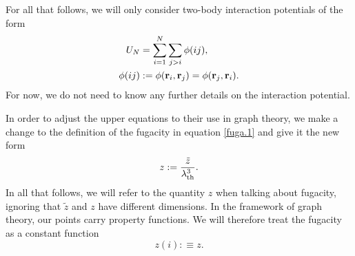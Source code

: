 \documentclass[8.5pt,twoside,twocolumn]{article}
\newcommand\di{\te{d}}
\newcommand\dr{\di\r}
\newcommand\lath{\enmat{\la_\te{th}}}
\renewcommand\r{\bo r}
\theoremstyle{standard}
\begin{document}

For all that follows, we will only consider two-body interaction potentials of the form
\begin{equation}
\begin{aligned}
U_N &= \sum_{i=1}^N \sum_{j>i} \phi(ij), \\
\phi(ij)&:=\phi(\r_i,\r_j) = \phi(\r_j,\r_i).
\label{potential}
\end{aligned}
\end{equation}
For now, we do not need to know any further details on the interaction potential.

In order to adjust the upper equations to their use in graph theory, we make a change to the definition
of the fugacity in equation \eqref{fuga.1} and give it the new form
\begin{equation}
z:=\frac {\tilde z} {\lath^3} .
\label{fuga.2}
\end{equation}
In all that follows, we will refer to the quantity $z$ when talking about fugacity, ignoring that
$\tilde z$ and $z$ have different dimensions. 
In the framework of graph theory, our points carry property functions. We will therefore treat the fugacity as a constant function
\begin{equation}
z(i):\equiv z.
\label{zconst}
\end{equation} 
\end{document}
